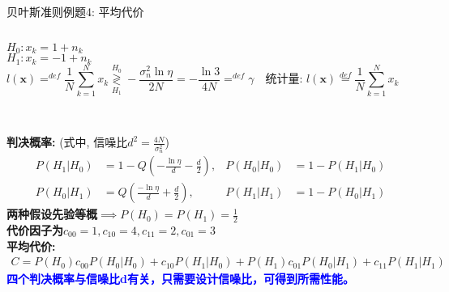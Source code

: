 \begin{frame}[shrink]{贝叶斯准则例题4: 平均代价}
\begin{columns}
	$H_0:x_k=1+n_k$\\
	$H_1:x_k=-1+n_k$
	\[
	l(\bm{x})\mathop{=}^{def}\frac{1}{N}\sum\limits_{k=1}^{N}x_k\mathop{\gtrless}\limits_{H_1}^{H_0}-\frac{\sigma_n^2\ln\eta}{2N}=-\frac{\ln3}{4N}\mathop{=}^{def}\gamma \quad \textbf{统计量: }l(\bm{x})\mathop{=}\limits^{def}\frac{1}{N}\sum\limits_{k=1}^{N}x_k
	\]
\end{columns}
~\\
\textbf{判决概率:} (式中, 信噪比$d^2=\frac{4N}{\sigma_n^2}$)
\begin{align*}
P(H_1|H_0)&=1-Q\left(-\frac{\ln\eta}{d}-\frac{d}{2}\right), &P(H_0|H_0)&=1-P(H_1|H_0)\\
P(H_0|H_1)&=Q\left(\frac{-\ln\eta}{d}+\frac{d}{2}\right),
&P(H_1|H_1)&=1-P(H_0|H_1)
\end{align*}
\textbf{两种假设先验等概$\implies P(H_0)=P(H_1)=\frac{1}{2}$}\\
\textbf{代价因子为$c_{00}=1, c_{10}=4, c_{11}=2, c_{01}=3$}\\
\textbf{平均代价:}
\begin{align*}
C=P(H_0)c_{00}P(H_0|H_0)+c_{10}P(H_1|H_0)+P(H_1)c_{01}P(H_0|H_1)+c_{11}P(H_1|H_1)
\end{align*}
\textbf{\textcolor{blue}{四个判决概率与信噪比d有关，只需要设计信噪比，可得到所需性能。}}
\end{frame}




